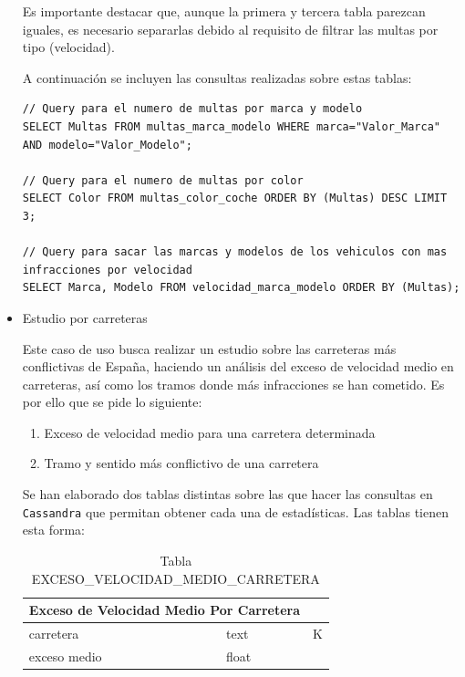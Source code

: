 \documentclass[]{article}
\begin{document}
\begin{itemize}
    Es importante destacar que, aunque la primera y tercera tabla parezcan iguales, es necesario separarlas debido al requisito de filtrar las multas por tipo (velocidad). 

    A continuación se incluyen las consultas realizadas sobre estas tablas:

    \lstset{style=cql}
    \begin{lstlisting}[language=cql, caption=Querys para el caso de uso 1]
// Query para el numero de multas por marca y modelo
SELECT Multas FROM multas_marca_modelo WHERE marca="Valor_Marca" AND modelo="Valor_Modelo";

// Query para el numero de multas por color
SELECT Color FROM multas_color_coche ORDER BY (Multas) DESC LIMIT 3;

// Query para sacar las marcas y modelos de los vehiculos con mas infracciones por velocidad
SELECT Marca, Modelo FROM velocidad_marca_modelo ORDER BY (Multas);
    \end{lstlisting}

    \item Estudio por carreteras

    Este caso de uso busca realizar un estudio sobre las carreteras más conflictivas de España, haciendo un análisis del exceso de velocidad medio en carreteras, así como los tramos donde más infracciones se han cometido. Es por ello que se pide lo siguiente:

    \begin{enumerate}
        \item Exceso de velocidad medio para una carretera determinada
        \item Tramo y sentido más conflictivo de una carretera 
    \end{enumerate}

    Se han elaborado dos tablas distintas sobre las que hacer las consultas en \texttt{Cassandra} que permitan obtener cada una de estadísticas. Las tablas tienen esta forma:  

    \begin{table}[H]
        \centering
        \begin{tabular}{lll} 
            \toprule
            \multicolumn{2}{c}{\large\textbf{Exceso de Velocidad Medio Por Carretera}} \\ 
            \midrule
            carretera      & text & K\\
            exceso medio     & float & \\
            \bottomrule
        \end{tabular}
        \caption {Tabla EXCESO\_VELOCIDAD\_MEDIO\_CARRETERA}
    \end{table}


\end{itemize}
\end{document}
